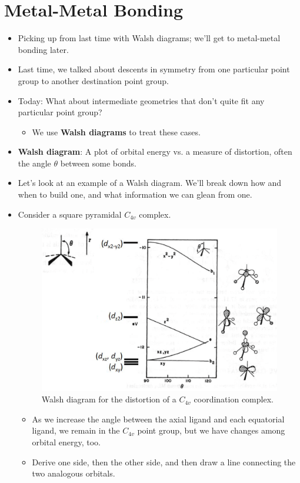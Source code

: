 \documentclass[../notes.tex]{subfiles}
\begin{document}
\section{Metal-Metal Bonding}
\begin{itemize}
    \item {}Picking up from last time with Walsh diagrams; we'll get to metal-metal bonding later.
    \item Last time, we talked about descents in symmetry from one particular point group to another destination point group.
    \item Today: What about intermediate geometries that don't quite fit any particular point group?
    \begin{itemize}
        \item We use \textbf{Walsh diagrams} to treat these cases.
    \end{itemize}
    \item \textbf{Walsh diagram}: A plot of orbital energy vs. a measure of distortion, often the angle $\theta$ between some bonds.
    \item Let's look at an example of a Walsh diagram. We'll break down how and when to build one, and what information we can glean from one.
    \item Consider a square pyramidal $C_{4v}$ complex.
    \begin{figure}[h!]
        \centering
        \includegraphics[width=0.5\linewidth]{../ExtFiles/WalshC4v.png}
        \caption{Walsh diagram for the distortion of a $C_{4v}$ coordination complex.}
        \label{fig:WalshC4v}
    \end{figure}
    \begin{itemize}
        \item As we increase the angle between the axial ligand and each equatorial ligand, we remain in the $C_{4v}$ point group, but we have changes among orbital energy, too.
        \item Derive one side, then the other side, and then draw a line connecting the two analogous orbitals.

\end{itemize}
\end{itemize}
\end{document}
